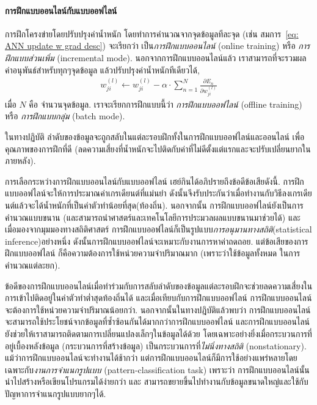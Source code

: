 \paragraph{การฝึกแบบออนไลน์กับแบบออฟไลน์} 
การฝึกโครงข่ายโดยปรับปรุงค่าน้ำหนัก โดยทำการคำนวณจากจุดข้อมูลทีละจุด (เช่น สมการ~\ref{eq: ANN update w grad desc}) จะเรียกว่า เป็น\textit{การฝึกแบบออนไลน์} (online training) หรือ \textit{การฝึกแบบส่วนเพิ่ม} (incremental mode).
นอกจากการฝึกแบบออนไลน์แล้ว
เราสามารถที่จะรวมผลค่าอนุพันธ์สำหรับทุกๆจุดข้อมูล แล้วปรับปรุงค่าน้ำหนักทีเดียวได้,
\begin{eqnarray}
   w^{(l)}_{ji}  \gets w^{(l)}_{ji} - \alpha \cdot \sum_{n=1}^N \frac{\partial E_n}{\partial w^{(l)}_{ji}}
\label{eq: ANN update w grad desc}
\end{eqnarray}
เมื่อ $N$ คือ จำนวนจุดข้อมูล.
เราจะเรียกการฝึกแบบนี้ว่า \textit{การฝึกแบบออฟไลน์} (offline training) หรือ \textit{การฝึกแบบกลุ่ม} (batch mode).

{\small
\begin{shaded}
ในทางปฏิบัติ 
ลำดับของข้อมูลจะถูกสลับในแต่ละรอบฝึกทั้งในการฝึกแบบออฟไลน์และออนไลน์
เพื่อคุณภาพของการฝึกที่ดี (ลดความเสี่ยงที่น้ำหนักจะไปติดกับค่าที่ไม่ดีตั้งแต่แรกและจะปรับเปลี่ยนยากในภายหลัง).

การเลือกระหว่างการฝึกแบบออนไลน์กับแบบออฟไลน์
เฮย์กิน\cite{Haykin2009a}ได้อภิปรายถึงข้อดีข้อเสียดังนี้.
การฝึกแบบออฟไลน์จะให้การประมาณค่าเกรเดียนต์ที่แม่นยำ ดังนั้นจึงรับประกันว่าเมื่อทำงานกับวิธีลงเกรเดียนต์แล้วจะได้น้ำหนักที่เป็นค่าตัวทำน้อยที่สุด(ท้องถิ่น).
นอกจากนั้น การฝึกแบบออฟไลน์ยังเป็นการคำนวณแบบขนาน (และสามารถนำศาสตร์และเทคโนโลยีการประมวลผลแบบขนานมาช่วยได้)
และ เมื่อมองจากมุมมองทางสถิติศาสตร์ การฝึกแบบออฟไลน์ก็เป็นรูปแบบ\textit{การอนุมานทางสถิติ}(statistical inference)อย่างหนึ่ง 
ดังนั้นการฝึกแบบออฟไลน์จะเหมาะกับงานการหาค่าถดถอย.
แต่ข้อเสียของการฝึกแบบออฟไลน์ ก็คือความต้องการใช้หน่วยความจำปริมาณมาก (เพราะว่าใช้ข้อมูลทั้งหมด ในการคำนวณแต่ละยก).

ข้อดีของการฝึกแบบออนไลน์เมื่อทำร่วมกับการสลับลำดับของข้อมูลแต่ละรอบฝึกจะช่วยลดความเสี่ยงในการเข้าไปติดอยู่ในค่าตัวทำต่ำสุดท้องถิ่นได้
และเมื่อเทียบกับการฝึกแบบออฟไลน์ การฝึกแบบออนไลน์จะต้องการใช้หน่วยความจำปริมาณน้อยกว่า.
นอกจากนั้นในทางปฎิบัติแล้วพบว่า การฝึกแบบออนไลน์จะสามารถใช้ประโยชน์จากข้อมูลที่ซ้ำซ้อนกันได้มากกว่าการฝึกแบบออฟไลน์
และการฝึกแบบออนไลน์ยังช่วยให้เราสามารถติดตามการเปลี่ยนแปลงเล็กๆในข้อมูลได้ด้วย โดยเฉพาะอย่างยิ่งเมื่อกระบวนการที่อยู่เบื้องหลังข้อมูล (กระบวนการที่สร้างข้อมูล) เป็นกระบวนการที่\textit{ไม่นิ่งทางสถิติ} (nonstationary).
แม้ว่าการฝึกแบบออนไลน์จะทำงานได้ช้ากว่า
แต่การฝึกแบบออนไลน์ก็มีการใช้อย่างแพร่หลายโดยเฉพาะกับ\textit{งานการจำแนกรูปแบบ} (pattern-classification task)
เพราะว่า การฝึกแบบออนไลน์นั้นนำไปสร้างหรือเขียนโปรแกรมได้ง่ายกว่า
และ สามารถขยายขึ้นไปทำงานกับข้อมูลขนาดใหญ่และใช้กับปัญหาการจำแนกรูปแบบยากๆได้.
\end{shaded}
}%

